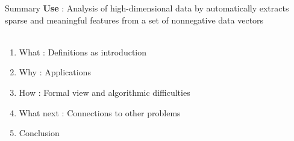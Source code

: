 \begin{frame}{Summary}
    \textbf{Use} : Analysis of high-dimensional data by automatically extracts sparse and meaningful features from a set of nonnegative data vectors\\
    ~\\
    \begin{enumerate}
        \item What : Definitions as introduction
        \item Why : Applications
        \item How : Formal view and algorithmic difficulties
        \item What next : Connections to other problems %
        \item Conclusion
    \end{enumerate}
\end{frame}

